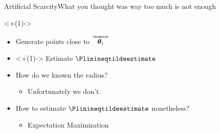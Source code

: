 \documentclass[aspectratio=169]{beamer}
\begin{document}
\begin{frame}{Artificial Scarcity}{What you thought was way too much is not enough}
{\begin{minipage}[c]{.4\linewidth}
\begin{figure}[h]
{
        }
      \end{figure}
    \end{minipage}
    \hfill
    \only<+(1)->{
      \begin{minipage}[c]{.55\linewidth}
        \begin{itemize}
          \item<+-> Generate points close to $\thetairestricted$
          \item<+(1)-> Estimate $\Plinineqtildeestimate$
        \end{itemize}
        \begin{itemize}[<+(1)->]
          \item How do we known the radius?
                \begin{itemize}
                  \item Unfortunately we don't.
                \end{itemize}
          \item How to estimate $\Plinineqtildeestimate$ nonetheless?
                \begin{itemize}
                  \item Expectation Maximization
                \end{itemize}
        \end{itemize}
      \end{minipage}
    }
  }
\end{frame}
\end{document}
